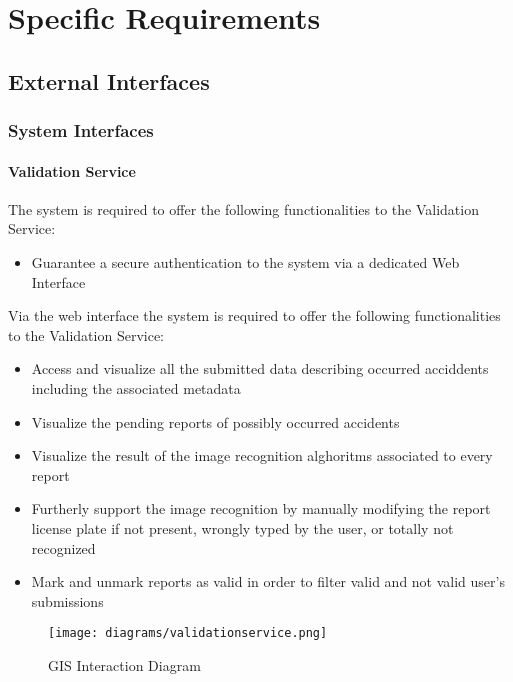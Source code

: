 \setlength{\parindent}{4ex}
\setlength{\parskip}{1ex}

\section{Specific Requirements}

\subsection{External Interfaces}

\subsubsection{System Interfaces}

\paragraph{Validation Service} The system is required to offer the following functionalities to the Validation Service:

	\begin{itemize}
		\item Guarantee a secure authentication to the system via a dedicated Web Interface
	\end{itemize}
Via the web interface the system is required to offer the following functionalities to the Validation Service:

	\begin{itemize}
		\item Access and visualize all the submitted data describing occurred acciddents including the associated metadata
		\item Visualize the pending reports of possibly occurred accidents
		\item Visualize the result of the image recognition alghoritms associated to every report
		\item Furtherly support the image recognition by manually modifying the report license plate if not present, wrongly typed by the user, or totally not recognized
		\item Mark and unmark reports as valid in order to filter valid and not valid user's submissions
	\end{itemize}

	\begin{figure}[h]
		\centering
		\texttt{[image: diagrams/validationservice.png]}
		\caption{
			\label{fig:externalGIS} GIS Interaction Diagram}
	\end{figure}

